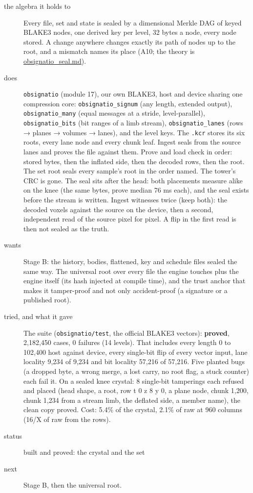 \begin{description}
\item[{the algebra it holds to}] Every file, set and state is sealed by a dimensional Merkle DAG of keyed BLAKE3 nodes, one derived key per level, 32 bytes a node, every node stored. A change anywhere changes exactly its path of nodes up to the root, and a mismatch names its place (A10; the theory is \hyperref[chap:obsignatio-seal]{obsignatio\_\allowbreak{}seal.md}).
\item[{does}] \texttt{obsignatio} (module 17), our own BLAKE3, host and device sharing one compression core: \texttt{obsignatio\_\allowbreak{}signum} (any length, extended output), \texttt{obsignatio\_\allowbreak{}many} (equal messages at a stride, level-parallel), \texttt{obsignatio\_\allowbreak{}bits} (bit ranges of a limb stream), \texttt{obsignatio\_\allowbreak{}lanes} (rows → planes → volumes → lanes), and the level keys. The \texttt{.\allowbreak{}kcr} stores its six roots, every lane node and every chunk leaf. Ingest seals from the source lanes and proves the file against them. Prove and load check in order: stored bytes, then the inflated side, then the decoded rows, then the root. The set root seals every sample's root in the order named. The tower's CRC is gone. The seal sits after the head: both placements measure alike on the knee (the same bytes, prove median 76 ms each), and the seal exists before the stream is written. Ingest witnesses twice (keep both): the decoded voxels against the source on the device, then a second, independent read of the source pixel for pixel. A flip in the first read is then not sealed as the truth.
\item[{wants}] Stage B: the history, bodies, flattened, key and schedule files sealed the same way. The universal root over every file the engine touches plus the engine itself (its hash injected at compile time), and the trust anchor that makes it tamper-proof and not only accident-proof (a signature or a published root).
\item[{tried, and what it gave}] The suite (\texttt{obsignatio/\allowbreak{}test}, the official BLAKE3 vectors): \textbf{proved}, 2,182,450 cases, 0 failures (14 levels). That includes every length 0 to 102,400 host against device, every single-bit flip of every vector input, lane locality 9,234 of 9,234 and bit locality 57,216 of 57,216. Five planted bugs (a dropped byte, a wrong merge, a lost carry, no root flag, a stuck counter) each fail it. On a sealed knee crystal: 8 single-bit tamperings each refused and placed (head shape, a root, row t 0 z 8 y 0, a plane node, chunk 1,200, chunk 1,234 from a stream limb, the deflated side, a member name), the clean copy proved. Cost: 5.4\% of the crystal, 2.1\% of raw at 960 columns (16/X of raw from the rows).
\item[{status}] built and proved: the crystal and the set
\item[{next}] Stage B, then the universal root.
\end{description}

